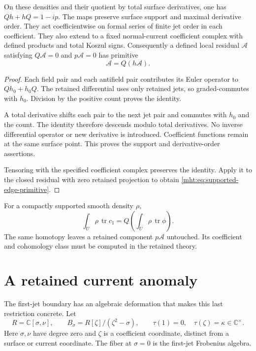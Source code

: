 \begin{theorem}\label{mht:thm:supported-edge-primitive}
On these densities and their quotient by total surface derivatives,
one has $Qh+hQ=1-ip$. The maps preserve surface support and maximal
derivative order. They act coefficientwise on formal series of
finite jet order in each coefficient. They also extend to a fixed
normal-current coefficient complex with defined products and total
Koszul signs.
Consequently a defined local residual $\mathcal A$ satisfying
$Q\mathcal A=0$ and $p\mathcal A=0$ has primitive
\begin{equation}\label{mht:eq:supported-edge-primitive}
 \mathcal A=Q(h\mathcal A).
\end{equation}
\end{theorem}

\begin{proof}
Each field pair and each antifield pair contributes its Euler
operator to $Qh_0+h_0Q$. The retained differential uses only retained
jets, so graded-commutes with $h_0$. Division by the positive count
proves the identity.

A total derivative shifts each pair to the
next jet pair and commutes with $h_0$ and the count. The identity
therefore descends modulo total derivatives. No inverse differential
operator or new derivative is introduced. Coefficient functions
remain at the same surface point. This proves the support and
derivative-order assertions.

Tensoring with the specified coefficient
complex preserves the identity. Apply it to the closed residual
with zero retained projection to obtain
\eqref{mht:eq:supported-edge-primitive}.
\end{proof}

For a compactly supported smooth density $\rho$,
\[
 \int_U\rho\,\operatorname{tr}c_1
       =Q\left(\int_U\rho\,\operatorname{tr}\phi\right).
\]
The same homotopy leaves a retained component $p\mathcal A$
untouched. Its coefficient and cohomology class must be computed
in the retained theory.

\section{A retained current anomaly}

The first-jet boundary has an algebraic deformation that makes this
last restriction concrete. Let
\[
 R=\mathbb C[\sigma,\nu],\qquad
 B_\sigma=R[\zeta]/(\zeta^2-\sigma),\qquad
 \tau(1)=0,\quad\tau(\zeta)=\kappa\in\mathbb C^\times.
\]
Here $\sigma,\nu$ have degree zero and $\zeta$ is a coefficient
coordinate, distinct from a surface or current coordinate. The
fiber at $\sigma=0$ is the first-jet Frobenius algebra.


